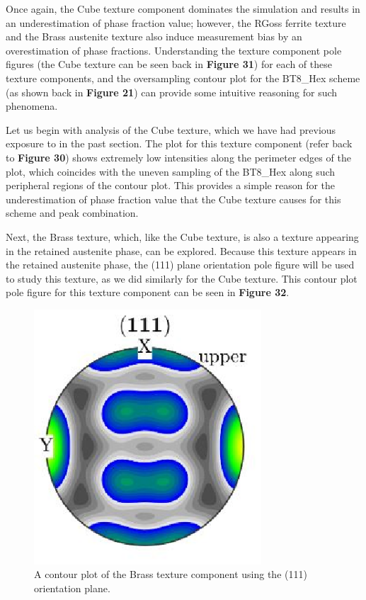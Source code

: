 \documentclass[10pt]{article}
\begin{document}
Once again, the Cube texture component dominates the simulation and results in an underestimation of phase fraction value; however, the RGoss ferrite texture and the Brass austenite texture also induce measurement bias by an overestimation of phase fractions. Understanding the texture component pole figures (the Cube texture can be seen back in \textbf{Figure 31}) 
for each of these texture components, and the oversampling contour plot for the BT8\_Hex scheme (as shown back in \textbf{Figure 21}) can provide some intuitive 
reasoning for such phenomena.

Let us begin with analysis of the Cube texture, which we have had previous exposure to in the past section. The plot for this texture component (refer back to \textbf{Figure 30}) shows 
extremely low intensities along the perimeter edges of the plot, which coincides with the uneven sampling of the BT8\_Hex along such peripheral regions of the 
contour plot. This provides a simple reason for the underestimation of phase fraction value that the Cube texture causes for this scheme and peak combination.

Next, the Brass texture, which, like the Cube texture, is also a texture appearing in the retained austenite phase, can be explored. Because this texture appears in the retained austenite phase, the (111) plane orientation pole 
figure will be used to study this texture, as
we did similarly for the Cube texture. This contour plot pole figure for this 
texture component can be seen in \textbf{Figure 32}.
\begin{figure}[h]
    \centering
    \includegraphics[width=8.5cm]{fig32}
    \caption{\label{tab1}A contour plot of the Brass texture component using the (111) orientation plane.} 
    \end{figure}
\end{document}
